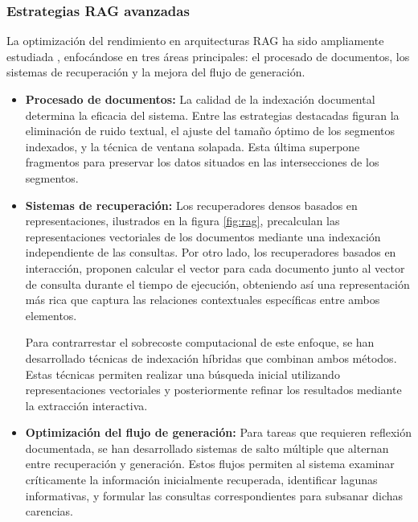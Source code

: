 \subsubsection{Estrategias RAG avanzadas}
La optimización del rendimiento en arquitecturas RAG ha sido ampliamente estudiada \cite{zhu_retrieving_2021}\cite{gao_retrieval-augmented_2024}, enfocándose en tres áreas principales: el procesado de documentos, los sistemas de recuperación y la mejora del flujo de generación.
\begin{itemize}
  \item {\textbf{Procesado de documentos:}} La calidad de la indexación documental determina la eficacia del sistema. Entre las estrategias destacadas figuran la eliminación de ruido textual, el ajuste del tamaño óptimo de los segmentos indexados, y la técnica de ventana solapada. Esta última superpone fragmentos para preservar los datos situados en las intersecciones de los segmentos. 

\item {\textbf{Sistemas de recuperación:}} Los recuperadores densos basados en representaciones, ilustrados en la figura \ref{fig:rag}, precalculan las representaciones vectoriales de los documentos mediante una indexación independiente de las consultas. Por otro lado, los recuperadores basados en interacción, proponen calcular el vector para cada documento junto al vector de consulta durante el tiempo de ejecución, obteniendo así una representación más rica que captura las relaciones contextuales específicas entre ambos elementos\cite{ma_query_nodate}\cite{levine_standing_2022}.

Para contrarrestar el sobrecoste computacional de este enfoque, se han desarrollado técnicas de indexación híbridas que combinan ambos métodos. Estas técnicas permiten realizar una búsqueda inicial utilizando representaciones vectoriales y posteriormente refinar los resultados mediante la extracción interactiva\cite{khattab_relevance-guided_2021}. 
  
\item {\textbf{Optimización del flujo de generación:}} Para tareas que requieren reflexión documentada, se han desarrollado sistemas de salto múltiple que alternan entre recuperación y generación\cite{khattab_demonstrate-search-predict_2023}\cite{shao_enhancing_2023}\cite{qi_answering_2021}\cite{zheng_take_2024}\cite{trivedi_interleaving_2023}. Estos flujos permiten al sistema examinar críticamente la información inicialmente recuperada, identificar lagunas informativas, y formular las consultas correspondientes para subsanar dichas carencias.

\end{itemize}

